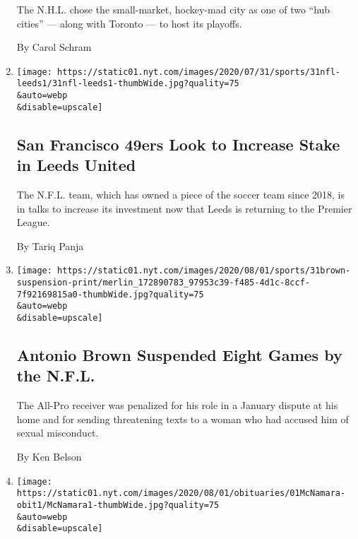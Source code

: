\begin{enumerate}
  The N.H.L. chose the small-market, hockey-mad city as one of two ``hub
  cities'' --- along with Toronto --- to host its playoffs.

  By Carol Schram
\item
  \href{/2020/07/31/sports/soccer/leeds-united-san-francisco-49ers.html}{}

  \texttt{[image: https://static01.nyt.com/images/2020/07/31/sports/31nfl-leeds1/31nfl-leeds1-thumbWide.jpg?quality=75\\\&auto=webp\\\&disable=upscale]}

  \hypertarget{san-francisco-49ers-look-to-increase-stake-in-leeds-united}{%
  \subsection{San Francisco 49ers Look to Increase Stake in Leeds
  United}\label{san-francisco-49ers-look-to-increase-stake-in-leeds-united}}

  The N.F.L. team, which has owned a piece of the soccer team since
  2018, is in talks to increase its investment now that Leeds is
  returning to the Premier League.

  By Tariq Panja
\item
  \href{/2020/07/31/sports/football/antonio-brown-suspension-nfl.html}{}

  \texttt{[image: https://static01.nyt.com/images/2020/08/01/sports/31brown-suspension-print/merlin\_172890783\_97953c39-f485-4d1c-8ccf-7f92169815a0-thumbWide.jpg?quality=75\\\&auto=webp\\\&disable=upscale]}

  \hypertarget{antonio-brown-suspended-eight-games-by-the-nfl}{%
  \subsection{Antonio Brown Suspended Eight Games by the
  N.F.L.}\label{antonio-brown-suspended-eight-games-by-the-nfl}}

  The All-Pro receiver was penalized for his role in a January dispute
  at his home and for sending threatening texts to a woman who had
  accused him of sexual misconduct.

  By Ken Belson
\item
  \href{/2020/07/31/sports/baseball/john-mcnamara-dead.html}{}

  \texttt{[image: https://static01.nyt.com/images/2020/08/01/obituaries/01McNamara-obit1/McNamara1-thumbWide.jpg?quality=75\\\&auto=webp\\\&disable=upscale]}

  \hypertarget{john-mcnamara-red-sox-skipper-in-86-series-loss-dies-at-88}{%
}
\end{enumerate}
